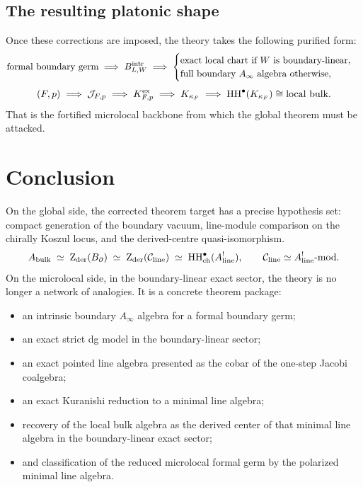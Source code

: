 \subsection*{The resulting platonic shape}

Once these corrections are imposed, the theory takes the following purified form:
\[
\text{formal boundary germ}
\;\Longrightarrow\;
B^{\mathrm{intr}}_{L,W}
\;\Longrightarrow\;
\begin{cases}
\text{exact local chart if $W$ is boundary-linear},\\
\text{full boundary $A_\infty$ algebra otherwise},
\end{cases}
\]
\[
(F,p)
\;\Longrightarrow\;
\mathcal J_{F,p}
\;\Longrightarrow\;
K^{\mathrm{ex}}_{F,p}
\;\Longrightarrow\;
K_{\kappa_F}
\;\Longrightarrow\;
\operatorname{HH}^\bullet(K_{\kappa_F})\cong \text{local bulk}.
\]
That is the fortified microlocal backbone from which the global theorem must be attacked.


\section{Conclusion}


On the global side, the corrected theorem target has a precise
hypothesis set: compact generation of the boundary vacuum,
line-module comparison on the chirally Koszul locus, and the
derived-centre quasi-isomorphism.
\[
A_{\mathrm{bulk}}
\;\simeq\;
\operatorname{Z}_{\mathrm{der}}(B_{\partial})
\;\simeq\;
\operatorname{Z}_{\mathrm{der}}(\mathcal C_{\mathrm{line}})
\;\simeq\;
\operatorname{HH}^\bullet_{\mathrm{ch}}(A^!_{\mathrm{line}}),
\qquad
\mathcal C_{\mathrm{line}}\simeq A^!_{\mathrm{line}}\text{-mod}.
\]
On the microlocal side, in the boundary-linear exact sector, the
theory is no longer a network of analogies. It is a concrete
theorem package:
\begin{itemize}[leftmargin=1.8em]
\item an intrinsic boundary $A_\infty$ algebra for a formal boundary germ;
\item an exact strict dg model in the boundary-linear sector;
\item an exact pointed line algebra presented as the cobar of the one-step Jacobi coalgebra;
\item an exact Kuranishi reduction to a minimal line algebra;
\item recovery of the local bulk algebra as the derived center of that minimal line algebra in the boundary-linear exact sector;
\item and classification of the reduced microlocal formal germ by the polarized minimal line algebra.
\end{itemize}

